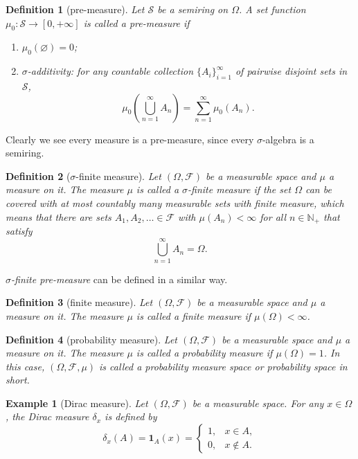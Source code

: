 \documentclass{report}
\newtheorem{definition}{Definition}[section]
\newtheorem{example}{Example}[section]
\theoremstyle{nonumberplain}
\begin{document}
\begin{definition}[pre-measure]
	Let $\mathcal{S}$ be a semiring on $\Omega$. A set function $\mu_0:\mathcal{S}\to[0,+\infty]$  is called a \emph{pre-measure} if
	\begin{enumerate}
		\item[(a)]$\mu_0(\varnothing) = 0$;
		\item[(b)]$\sigma$-additivity: for any countable collection $\{A_{i}\}_{i=1}^{\infty }$ of pairwise disjoint sets in $\mathcal{S}$,
		\[
		\mu_0\left(\bigcup_{n=1}^\infty A_n\right)=\sum_{n=1}^{\infty}\mu_0(A_n).
		\]
	\end{enumerate}
\end{definition}

Clearly we see every measure is a pre-measure, since every $\sigma$-algebra is a semiring.

\begin{definition}[$\sigma$-finite measure]
	Let $(\Omega,{\mathcal {F}})$ be a measurable space and $\mu$ a measure on it. The measure $\mu$ is called a \emph{$\sigma$-finite measure} if the set $\Omega$ can be covered with at most countably many measurable sets with finite measure, which means that there are sets $A_{1},A_{2},\ldots \in {\mathcal {F}}$ with $\mu \left(A_{n}\right)<\infty$ for all $n\in \mathbb {N_+}$ that satisfy 
	\[
	\bigcup_{n=1}^{\infty}A_{n}=\Omega.
	\]
\end{definition}
\emph{$\sigma$-finite pre-measure} can be defined in a similar way. 

\begin{definition}[finite measure]
	Let $(\Omega,{\mathcal {F}})$ be a measurable space and $\mu$ a measure on it. The measure $\mu$ is called a \emph{finite measure} if $\mu(\Omega)<\infty$.
\end{definition}

\begin{definition}[probability measure]
	Let $(\Omega,{\mathcal {F}})$ be a measurable space and $\mu$ a measure on it. The measure $\mu$ is called a \emph{probability measure} if $\mu(\Omega)=1$. In this case, $(\Omega,{\mathcal {F}},\mu)$ is called a \emph{probability measure space} or \emph{probability space} in short.
\end{definition}

\begin{example}[Dirac measure]
	Let $(\Omega,{\mathcal {F}})$ be a measurable space. For any $x\in \Omega$, the \emph{Dirac measure} $\delta_x$ is defined by
	\[
	\delta_x(A)=\mathbf{1}_A(x)=\begin{cases}
	1, & x\in A,\\
	0, & x\notin A.
	\end{cases}
	\]
\end{example}
\end{document}
